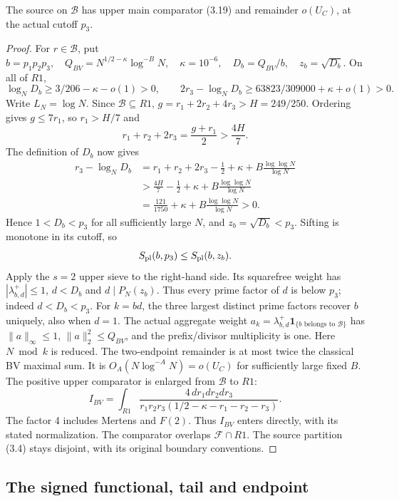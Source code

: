 \begin{lemma}
The source on $\mathcal B$ has upper main comparator (3.19)
and remainder $o(U_C)$, at the actual cutoff $p_3$.
\end{lemma}
\begin{proof}
For $r\in\mathcal B$, put
$b=p_1p_2p_3,\quad Q_{BV}=N^{1/2-\kappa}\log^{-B}N,
 \quad\kappa=10^{-6},\quad D_b=Q_{BV}/b,\quad z_b=\sqrt{D_b}.$
On all of $R1$,
\[
 \log_ND_b\ge3/206-\kappa-o(1)>0,\qquad
 2r_3-\log_ND_b\ge63823/309000+\kappa+o(1)>0.
 \tag{3.18}
\]
Write $L_N=\log N$. Since $\mathcal B\subseteq R1$,
$g=r_1+2r_2+4r_3>H=249/250$. Ordering gives $g\le7r_1$, so
$r_1>H/7$ and
\[
 r_1+r_2+2r_3=\frac{g+r_1}{2}>\frac{4H}{7}.
\]
The definition of $D_b$ now gives
\[
\begin{aligned}
 r_3-\log_ND_b
 &=r_1+r_2+2r_3-\frac12+\kappa
       +B\frac{\log\log N}{\log N}\\
 &>\frac{4H}{7}-\frac12+\kappa
       +B\frac{\log\log N}{\log N}\\
 &=\frac{121}{1750}+\kappa
       +B\frac{\log\log N}{\log N}>0.
\end{aligned}
\]
Hence $1<D_b<p_3$ for all sufficiently large $N$, and
$z_b=\sqrt{D_b}<p_3$. Sifting is monotone in its cutoff, so
\[
 S_{\rm pl}(b,p_3)\le S_{\rm pl}(b,z_b).
\]
Apply the $s=2$ upper sieve to the right-hand side.
Its squarefree weight has $|\lambda^+_{b,d}|\le1$,
$d<D_b$ and $d\mid P_N(z_b)$. Thus every prime factor of $d$
is below $p_3$; indeed $d<D_b<p_3$.
For $k=bd$, the three largest distinct prime factors recover $b$ uniquely, also when $d=1$.
The actual aggregate weight
$a_k=\lambda^+_{b,d}\mathbf1_{\{b\text{ belongs to }\mathcal B\}}$
has $\|a\|_\infty\le1$, $\|a\|_2^2\le Q_{BV}$, and the prefix/divisor multiplicity is one.
Here $N\bmod k$ is reduced.
The two-endpoint remainder is at most twice the classical BV maximal sum.
It is $O_A(N\log^{-A}N)=o(U_C)$ for sufficiently large fixed $B$.
The positive upper comparator is enlarged from $\mathcal B$ to $R1$:
\[
 I_{BV}=\int_{R1}\frac{4\,dr_1dr_2dr_3}
 {r_1r_2r_3(1/2-\kappa-r_1-r_2-r_3)}.
 \tag{3.19}
\]
The factor 4 includes Mertens and $F(2)$.
Thus $I_{BV}$ enters directly, with its stated normalization.
The comparator overlaps $\mathcal F\cap R1$.
The source partition (3.4) stays disjoint, with its original boundary conventions.
\end{proof}

\subsection{The signed functional, tail and endpoint}
\label{sec:s2-6}\label{sec:s2-7}

